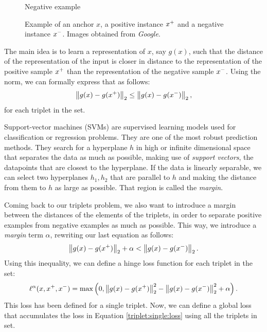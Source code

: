 \begin{nexample}
\begin{figure}[H]
          \caption*{Negative example}\label{fig:doggo}
        \endminipage
        \caption{Example of an anchor $x$, a positive instance $x^+$ and a negative instance $x^-$. Images obtained from \emph{Google}.}
        \end{figure}
    \end{nexample}
    


The main idea is to learn a representation of $x$, say $g(x)$, such that the distance of the representation of the input is closer in distance to the representation of the positive sample $x^+$ than the representation of the negative sample $x^-$. Using the norm\footnotemark, we can formally express that as follows: 
$$
\left\lVert g(x) - g(x^+)\right\rVert_2 \leq \left\lVert g(x) - g(x^-)\right\rVert_2,
$$
for each triplet in the set.




Support-vector machines (SVMs) are supervised learning models used for classification or regression problems. They are one of the most robust prediction methods. They search for a hyperplane $h$ in high or infinite dimensional space that separates the data as much as possible, making use of \emph{support vectors}, the datapoints that are closest to the hyperplane. If the data is linearly separable, we can select two hyperplanes $h_1,h_2$ that are parallel to $h$ and making the distance from them to $h$ as large as possible. That region is called the \emph{margin}.

Coming back to our triplets problem, we also want to introduce a margin between the distances of the elements of the triplets, in order to separate positive examples from negative examples as much as possible. This way, we introduce a \emph{margin} term $\alpha$, rewriting our last equation as follows:
\[
\left\lVert g(x) - g(x^+)\right\rVert_2 + \alpha < \left\lVert g(x) - g(x^-)\right\rVert_2.
\]
Using this inequality, we can define a hinge loss function for each triplet in the set:
\begin{equation}\label{triplet:single:loss}
\ell^\alpha (x,x^+,x^-) = \max \left(0, \left\lVert g(x) - g(x^+)\right\rVert_2^2 - \left\lVert g(x) - g(x^-)\right\rVert_2^2 + \alpha\right).
\end{equation}
This loss has been defined for a single triplet. Now, we can define a global loss that accumulates the loss in Equation \eqref{triplet:single:loss} using all the triplets in set.


